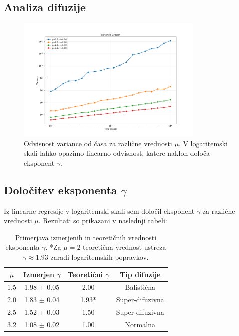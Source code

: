 \documentclass{article}
\begin{document}
\newpage 

\subsection{Analiza difuzije}

\begin{figure}[ht]
\centering
\includegraphics[width=0.8\textwidth]{variance_growth.pdf}
\caption{Odvisnost variance od časa za različne vrednosti $\mu$. V logaritemski skali lahko opazimo linearno odvisnost, katere naklon določa eksponent $\gamma$.}
\label{fig:variance}
\end{figure}

\subsection{Določitev eksponenta $\gamma$}

Iz linearne regresije v logaritemski skali sem določil eksponent $\gamma$ za različne vrednosti $\mu$. 
Rezultati so prikazani v naslednji tabeli:

\begin{table}[ht]
\centering
\begin{tabular}{|c|c|c|c|}
\hline
$\mu$ & Izmerjen $\gamma$ & Teoretični $\gamma$ & Tip difuzije \\
\hline
1.5 & 1.98 $\pm$ 0.05 & 2.00 & Balistična \\
2.0 & 1.83 $\pm$ 0.04 & 1.93* & Super-difuzivna \\
2.5 & 1.52 $\pm$ 0.03 & 1.50 & Super-difuzivna \\
3.2 & 1.08 $\pm$ 0.02 & 1.00 & Normalna \\
\hline
\end{tabular}
\caption{Primerjava izmerjenih in teoretičnih vrednosti eksponenta $\gamma$. *Za $\mu=2$ teoretična vrednost ustreza $\gamma \approx 1.93$ zaradi logaritemskih popravkov.}
\label{tab:gamma}
\end{table}
\end{document}
